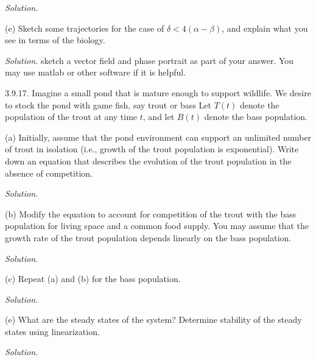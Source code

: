 \documentclass{article}
\begin{document}
\textit{Solution.}

\vspace{5mm}

(e) Sketch some trajectories for the case of $\delta < 4(\alpha - \beta)$,
and explain what you see in terms of the biology.

\textit{Solution.}
sketch a vector field and phase portrait as part of your answer.  You
may use matlab or other software if it is helpful.

\newpage

3.9.17. Imagine a small pond that is mature enough to support wildlife.
We desire to stock the pond with game fish, say trout or bass Let $T(t)$
denote the population of the trout at any time $t$, and let $B(t)$
denote the bass population.

(a) Initially, assume that the pond environment can support an unlimited
number of trout in isolation (i.e., growth of the trout population is
exponential). Write down an equation that describes the evolution of the
trout population in the absence of competition.

\textit{Solution.}

\vspace{5mm}

(b) Modify the equation to account for competition of the trout with the
bass population for living space and a common food supply. You may assume
that the growth rate of the trout population depends linearly on the bass
population.

\textit{Solution.}

\vspace{5mm}

(c) Repeat (a) and (b) for the bass population.

\textit{Solution.}

\vspace{5mm}

(e) What are the steady states of the system? Determine stability of the
steady states using linearization.

\textit{Solution.}
\end{document}
